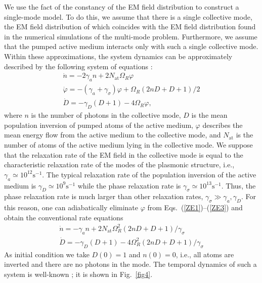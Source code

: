 \documentclass[aps,pra,amsmath,amssymb,onecolumn,superscriptaddress,showpacs,floatfix,]{revtex4-1}
\begin{document}
We use the fact of the constancy of the EM field distribution to construct a single-mode model. To do this, we assume that there is a single collective mode, the EM field distribution of which coincides with the EM field distribution found in the numerical simulations of the multi-mode problem. Furthermore, we assume that the pumped active medium interacts only with such a single collective mode. Within these approximations, the system dynamics can be approximately described by the following system of equations \cite{SiegmanLasers}:
\begin{gather} 
\dot n =  - 2{\gamma _a}n + 2{N_{\text{at}}}{\Omega _R}\varphi \label{ZE1}
\\
\dot \varphi = - \left( {{\gamma _a} + {\gamma _\sigma }} \right)\varphi + {\Omega _R}\left( {2nD + D + 1} \right)/2 \label{ZE2}
\\
\dot D =  - {\gamma _D}\left( {D + 1} \right) - 4{\Omega _R}\varphi, \label{ZE3}
\end{gather}
where $n$ is the number of photons in the collective mode, $D$ is the mean population inversion of pumped atoms of the active medium, $\varphi$ describes the mean energy flow from the active medium to the collective mode, and $N_{\text{at}}$ is the number of atoms of the active medium lying in the collective mode.
We suppose that the relaxation rate of the EM field in the collective mode is equal to the characteristic relaxation rate of the modes of the plasmonic structure, i.e., $\gamma_a \simeq 10^{12} \text{s}^{-1}$.
The typical relaxation rate of the population inversion of the active medium is $\gamma_D \simeq 10^9 \text{s}^{-1}$ while the phase relaxation rate is $\gamma_{\sigma}\simeq 10^{13} \text{s}^{-1}$.
Thus, the phase relaxation rate is much larger than other relaxation rates, $\gamma_\sigma \gg \gamma_a, \gamma_D$.
For this reason, one can adiabatically eliminate $\varphi$ from Eqs.~(\ref{ZE1})--(\ref{ZE3}) and obtain the conventional rate equations
\begin{gather} 
\dot n =  - {\gamma _a}n + 2{N_{\text{at}}}\Omega _R^2\left( {2nD + D + 1} \right)/{\gamma _\sigma } \label{RE1}
\\
\dot D =  - {\gamma _D}\left( {D + 1} \right) - 4\Omega _R^2\left( {2nD + D + 1} \right)/{\gamma _\sigma } \label{RE2}
\end{gather}
As initial condition we take $D(0) = 1$ and $n(0) = 0$, i.e., all atoms are inverted and there are no photons in the mode.
The temporal dynamics of such a system is well-known \cite{SiegmanLasers}; it is shown in Fig.~\ref{fig4}.
\end{document}
